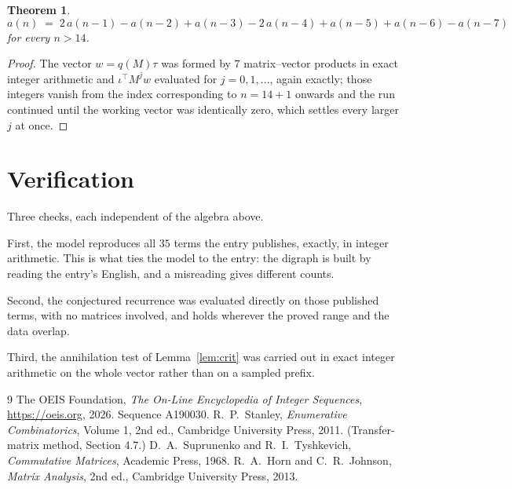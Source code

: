 \documentclass[11pt,a4paper]{article}
\theoremstyle{plain}
\newtheorem{theorem}{Theorem}
\theoremstyle{definition}
\begin{document}
\begin{theorem}
\[
a(n)\;=\;2\,a(n-1) - a(n-2) + a(n-3) - 2\,a(n-4) + a(n-5) + a(n-6) - a(n-7)
\]
for every $n>14$.
\end{theorem}

\begin{proof}
The vector $w=q(M)\tau$ was formed by $7$ matrix--vector products in exact integer
arithmetic and $\iota^{\!\top}M^{j}w$ evaluated for $j=0,1,\dots$, again exactly; those
integers vanish from the index corresponding to $n=14+1$ onwards and the run continued
until the working vector was identically zero, which settles every larger $j$ at once.
\end{proof}

\section{Verification}

Three checks, each independent of the algebra above.

First, the model reproduces all $35$ terms the entry publishes, exactly, in integer
arithmetic. This is what ties the model to the entry: the digraph is built by reading the
entry's English, and a misreading gives different counts.

Second, the conjectured recurrence was evaluated directly on those published terms, with no
matrices involved, and holds wherever the proved range and the data overlap.

Third, the annihilation test of Lemma~\ref{lem:crit} was carried out in exact integer
arithmetic on the whole vector rather than on a sampled prefix.

\begin{thebibliography}{9}
 The OEIS Foundation, \emph{The On-Line Encyclopedia of Integer
Sequences}, \url{https://oeis.org}, 2026. Sequence A190030.
 R.~P.~Stanley, \emph{Enumerative Combinatorics}, Volume 1, 2nd ed.,
Cambridge University Press, 2011. (Transfer-matrix method, Section 4.7.)
 D.~A.~Suprunenko and R.~I.~Tyshkevich, \emph{Commutative Matrices},
Academic Press, 1968.
 R.~A.~Horn and C.~R.~Johnson, \emph{Matrix Analysis}, 2nd ed., Cambridge
University Press, 2013.
\end{thebibliography}
\end{document}
